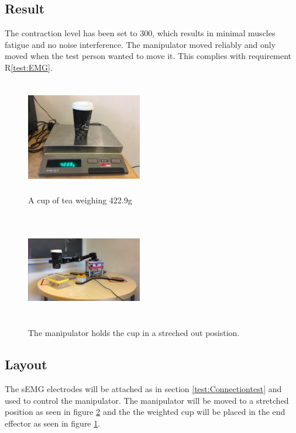 \subsection*{Result}
The contraction level has been set to 300, which results in minimal muscles fatigue and no noise interference. The manipulator moved reliably and only moved when the test person wanted to move it. This complies with requirement R\ref{test:EMG}.\\
\newpage
{} \label{sec:Lift}
\begin{multicols}{2}
\begin{figure}[H]
    \centering
    \includegraphics[width=0.45\textwidth, height=5cm]{Figures/Technical_figures/image3.jpg}
    \caption{A cup of tea weighing 422.9g}
    \label{fig:Tea}
\end{figure}
\columnbreak
\begin{figure}[H]
    \centering
    \includegraphics[width=0.45\textwidth,height=5cm]{Figures/Technical_figures/image4.png}
    \caption{The manipulator holds the cup in a streched out posistion.}
    \label{fig:stretch}
\end{figure}
\end{multicols}

\subsection*{Layout}
The sEMG electrodes will be attached as in section \ref{test:Connectiontest} and used to control the manipulator.
The manipulator will be moved to a stretched position as seen in figure \ref{fig:stretch} and the the weighted cup will be placed in the end effector as seen in figure \ref{fig:Tea}. 
